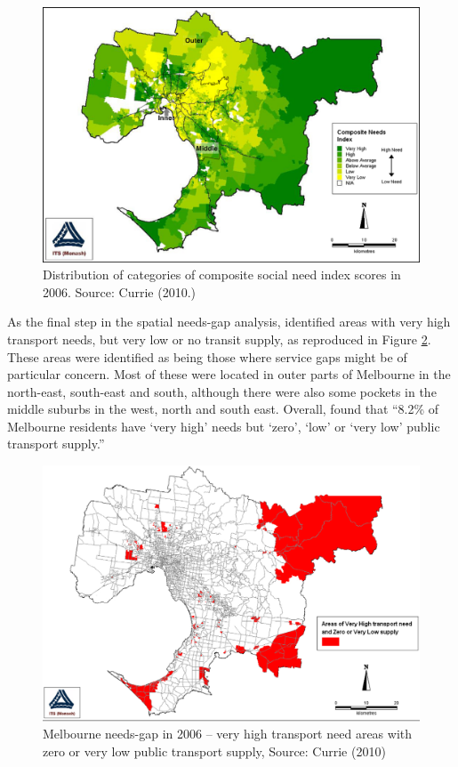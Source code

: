 \documentclass[preprint, 3p,
authoryear]{elsarticle} %
\begin{document}
\begin{figure}
\includegraphics[width=1\linewidth]{graphics/Currie2010Needs} \caption{Distribution of categories of composite social need index scores in 2006. Source: Currie (2010.)}\label{fig:Currie_map_needs}
\end{figure}

As the final step in the spatial needs-gap analysis,
\citet{currie2010identifying} identified areas with very high transport
needs, but very low or no transit supply, as reproduced in Figure
\ref{fig:Currie_map_gap}. These areas were identified as being those
where service gaps might be of particular concern. Most of these were
located in outer parts of Melbourne in the north-east, south-east and
south, although there were also some pockets in the middle suburbs in
the west, north and south east. Overall, \citet{currie2010identifying}
found that ``8.2\% of Melbourne residents have `very high' needs but
`zero', `low' or `very low' public transport supply.''

\begin{figure}
\includegraphics[width=1\linewidth]{graphics/Currie2010gap} \caption{Melbourne needs-gap in 2006 – very high transport need areas with zero or very low public transport supply, Source: Currie (2010)}\label{fig:Currie_map_gap}
\end{figure}
\end{document}

